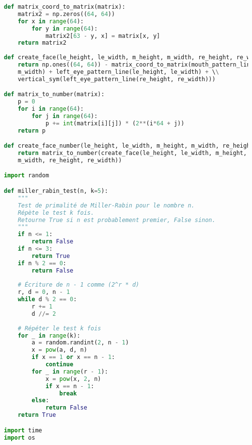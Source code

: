 \documentclass{article}
\begin{document}
\begin{lstlisting}[language = Python]
def matrix_coord_to_matrix(matrix):
    matrix2 = np.zeros((64, 64))
    for x in range(64):
        for y in range(64):
            matrix2[63 - y, x] = matrix[x, y]
    return matrix2
    
def create_face(le_height, le_width, m_height, m_width, re_height, re_width):
    return np.ones((64, 64)) - matrix_coord_to_matrix(mouth_pattern_line(m_height, \\
    m_width) + left_eye_pattern_line(le_height, le_width) + \\
    vertical_sym(left_eye_pattern_line(re_height, re_width)))

def matrix_to_number(matrix):
    p = 0
    for i in range(64):
        for j in range(64):
            p += int(matrix[i][j]) * (2**(i*64 + j))
    return p

def create_face_number(le_height, le_width, m_height, m_width, re_height, re_width):
    return matrix_to_number(create_face(le_height, le_width, m_height, \\
    m_width, re_height, re_width))

import random

def miller_rabin_test(n, k=5):
    """
    Test de primalité de Miller-Rabin pour le nombre n.
    Répète le test k fois.
    Retourne True si n est probablement premier, False sinon.
    """
    if n <= 1:
        return False
    if n <= 3:
        return True
    if n % 2 == 0:
        return False
    
    # Écriture de n - 1 comme (2^r * d)
    r, d = 0, n - 1
    while d % 2 == 0:
        r += 1
        d //= 2
    
    # Répéter le test k fois
    for _ in range(k):
        a = random.randint(2, n - 1)
        x = pow(a, d, n)
        if x == 1 or x == n - 1:
            continue
        for _ in range(r - 1):
            x = pow(x, 2, n)
            if x == n - 1:
                break
        else:
            return False
    return True

import time
import os


\end{lstlisting}
\end{document}
